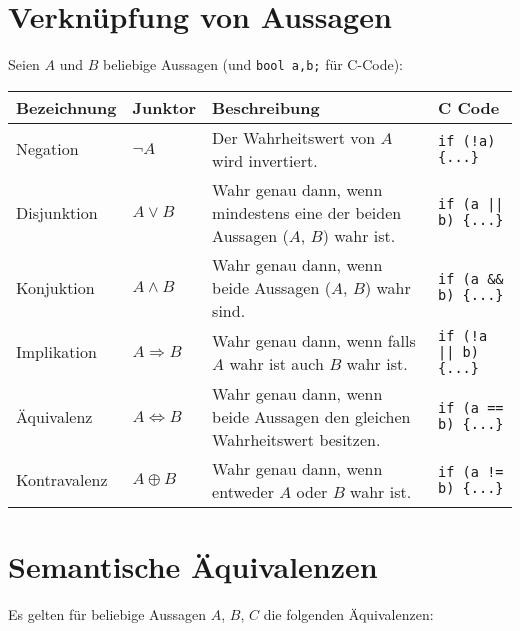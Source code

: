 \documentclass{article}
\begin{document}
\large
\section*{Verknüpfung von Aussagen}
Seien $A$ und $B$ beliebige Aussagen (und \texttt{bool a,b;} für C-Code):

\begin{adjustbox}{center}
	\begin{tabular}{L{4cm}|C{1.5cm}|L{5cm}|C{5cm}}
		Bezeichnung  & Junktor               & Beschreibung                                                                   & C Code                         \\
		[10pt]\midrule
		Negation     & $\neg A$              & Der Wahrheitswert von $A$ wird invertiert.                                     & \texttt{if (!a) \{...\}}       \\
		[10pt]
		Disjunktion  & $A \lor B$            & Wahr genau dann, wenn mindestens eine der beiden Aussagen ($A$, $B$) wahr ist. & \texttt{if (a || b) \{...\}}   \\
		[10pt]
		Konjuktion   & $A \land B$           & Wahr genau dann, wenn beide Aussagen ($A$, $B$) wahr sind.                     & \texttt{if (a \&\& b) \{...\}} \\
		[10pt]
		Implikation  & $A \Rightarrow B$     & Wahr genau dann, wenn falls $A$ wahr ist auch $B$ wahr ist.                    & \texttt{if (!a || b) \{...\}}  \\
		[10pt]
		Äquivalenz   & $A \Leftrightarrow B$ & Wahr genau dann, wenn beide Aussagen den gleichen Wahrheitswert besitzen.      & \texttt{if (a == b) \{...\}}   \\
		[10pt]
		Kontravalenz & $A \oplus B$          & Wahr genau dann, wenn entweder $A$ oder $B$ wahr ist.                          & \texttt{if (a != b) \{...\}}   \\
		[10pt]
	\end{tabular}
\end{adjustbox}

\newpage
\section*{Semantische Äquivalenzen}
Es gelten für beliebige Aussagen $A$, $B$, $C$ die folgenden Äquivalenzen:
\end{document}
